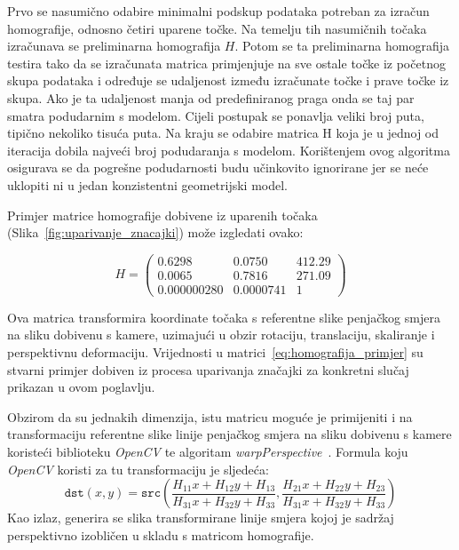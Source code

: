 Prvo se nasumično odabire minimalni podskup podataka potreban za izračun homografije, odnosno četiri uparene točke. Na temelju tih nasumičnih točaka izračunava se preliminarna homografija $H$. Potom se ta preliminarna homografija testira tako da se izračunata matrica primjenjuje na sve ostale točke iz početnog skupa podataka i određuje se udaljenost između izračunate točke i prave točke iz skupa. Ako je ta udaljenost manja od predefiniranog praga onda se taj par smatra podudarnim s modelom. Cijeli postupak se ponavlja veliki broj puta, tipično nekoliko tisuća puta. 
Na kraju se odabire matrica H koja je u jednoj od iteracija dobila najveći broj podudaranja s modelom. Korištenjem ovog algoritma osigurava se da pogrešne podudarnosti budu učinkovito ignorirane jer se neće uklopiti ni u jedan konzistentni geometrijski model.

Primjer matrice homografije dobivene iz uparenih točaka (Slika~\ref{fig:uparivanje_znacajki}) može izgledati ovako:


\begin{equation}
    H =
    \begin{pmatrix}
        0.6298 & 0.0750 & 412.29 \\
        0.0065 & 0.7816 & 271.09 \\
        0.000000280 & 0.0000741 & 1
    \end{pmatrix}
    \label{eq:homografija_primjer}
\end{equation}

Ova matrica transformira koordinate točaka s referentne slike penjačkog smjera na sliku dobivenu s kamere, uzimajući u obzir rotaciju, translaciju, skaliranje i perspektivnu deformaciju. Vrijednosti u matrici~\ref{eq:homografija_primjer} su stvarni primjer dobiven iz procesa uparivanja značajki za konkretni slučaj prikazan u ovom poglavlju.


Obzirom da su jednakih dimenzija, istu matricu moguće je primijeniti i na transformaciju referentne slike linije penjačkog smjera na sliku dobivenu s kamere koristeći biblioteku \textit{OpenCV} te algoritam \textit{warpPerspective}~\cite{warpperspective}. Formula koju \textit{OpenCV} koristi za tu transformaciju je sljedeća:
\begin{equation}
    \texttt{dst}(x,y) = \texttt{src} \left ( \frac{H_{11} x + H_{12} y + H_{13}}{H_{31} x + H_{32} y + H_{33}} ,
     \frac{H_{21} x + H_{22} y + H_{23}}{H_{31} x + H_{32} y + H_{33}} \right )
\end{equation}
Kao izlaz, generira se slika transformirane linije smjera kojoj je sadržaj perspektivno izobličen u skladu s matricom homografije. 

